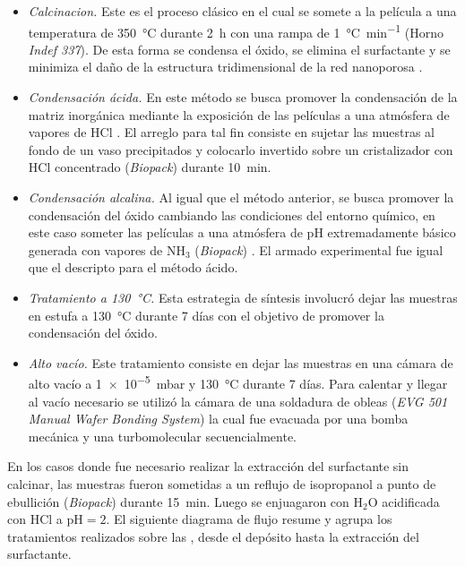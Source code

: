 				\begin{itemize}

				\item \textit{Calcinacion.} Este es el proceso clásico en el cual se somete a la película a una temperatura de \SI{350}{\celsius} durante \SI{2}{\hour} con una rampa de \SI{1}{\celsius.\minute^{-1}} (Horno \textit{Indef 337}). De esta forma se condensa el óxido, se elimina el surfactante y se minimiza el daño de la estructura tridimensional de la red nanoporosa \cite{Crepaldi2003}.

				\item \textit{Condensación ácida.} En este método se busca promover la condensación de la matriz inorgánica mediante la exposición de las películas a una atmósfera de vapores de HCl \cite{Doshi2000a}. El arreglo para tal fin consiste en sujetar las muestras al fondo de un vaso precipitados y colocarlo invertido sobre un cristalizador con HCl concentrado (\textit{Biopack}) durante \SI{10}{\minute}. 

				\item \textit{Condensación alcalina.} Al igual que el método anterior, se busca promover la condensación del óxido cambiando las condiciones del entorno químico, en este caso someter las películas a una atmósfera de pH extremadamente básico generada con vapores de NH$_3$ (\textit{Biopack}) \cite{Soler-Illia2012,Soler-Illia2011}. El armado experimental fue igual que el descripto para el método ácido.

				\item \textit{Tratamiento a \SI{130}{\celsius}.} Esta estrategia de síntesis involucró dejar las muestras en estufa a \SI{130}{\celsius} durante 7 días con el objetivo de promover la condensación del óxido.

				\item \textit{Alto vacío.} Este tratamiento consiste en dejar las muestras en una cámara de alto vacío a \SI{1e-5}{\milli\bar} y \SI{130}{\celsius} durante 7 días. Para calentar y llegar al vacío necesario se utilizó la cámara de una soldadura de obleas (\textit{EVG 501 Manual Wafer Bonding System}) la cual fue evacuada por una bomba mecánica y una turbomolecular secuencialmente.

				\end{itemize}
					
		En los casos donde fue necesario realizar la extracción del surfactante sin calcinar, las muestras fueron sometidas a un reflujo de isopropanol a punto de ebullición (\textit{Biopack}) durante \SI{15}{\minute}. Luego se enjuagaron con H$_2$O acidificada con HCl a $\text{pH}=2$. El siguiente diagrama de flujo resume y agrupa los tratamientos realizados sobre las \pdm, desde el depósito hasta la extracción del surfactante.
		
